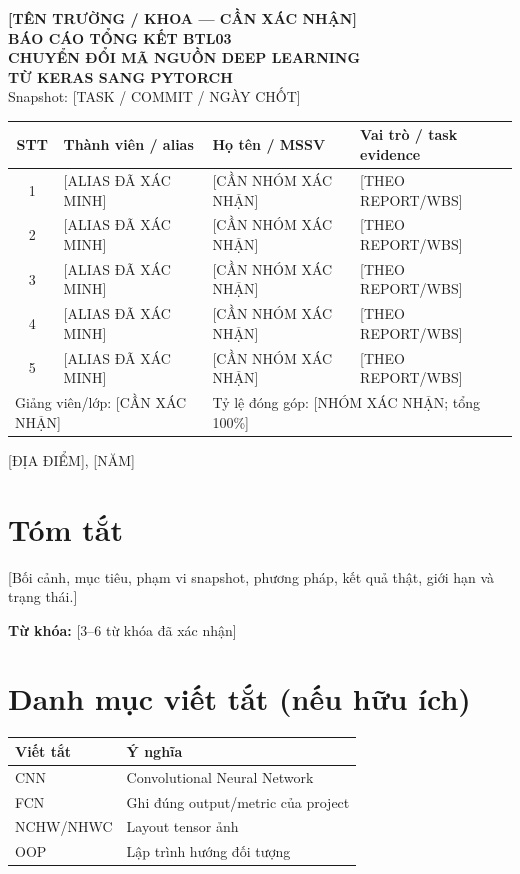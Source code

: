 \begin{titlepage}
\thispagestyle{empty}
\begin{center}
\vspace*{1.4cm}
{\Large\bfseries [TÊN TRƯỜNG / KHOA — CẦN XÁC NHẬN]}\\[1.5cm]
{\Large\bfseries BÁO CÁO TỔNG KẾT BTL03}\\[0.6cm]
{\LARGE\bfseries CHUYỂN ĐỔI MÃ NGUỒN DEEP LEARNING\\ TỪ KERAS SANG PYTORCH}\\[0.8cm]
Snapshot: [TASK / COMMIT / NGÀY CHỐT]

\vfill
\begin{tabularx}{\textwidth}{c p{} p{} X}
\toprule
STT & Thành viên / alias & Họ tên / MSSV & Vai trò / task evidence \\
\midrule
1 & [ALIAS ĐÃ XÁC MINH] & [CẦN NHÓM XÁC NHẬN] & [THEO REPORT/WBS] \\
2 & [ALIAS ĐÃ XÁC MINH] & [CẦN NHÓM XÁC NHẬN] & [THEO REPORT/WBS] \\
3 & [ALIAS ĐÃ XÁC MINH] & [CẦN NHÓM XÁC NHẬN] & [THEO REPORT/WBS] \\
4 & [ALIAS ĐÃ XÁC MINH] & [CẦN NHÓM XÁC NHẬN] & [THEO REPORT/WBS] \\
5 & [ALIAS ĐÃ XÁC MINH] & [CẦN NHÓM XÁC NHẬN] & [THEO REPORT/WBS] \\
\midrule
\multicolumn{2}{l}{Giảng viên/lớp: [CẦN XÁC NHẬN]} & \multicolumn{2}{l}{Tỷ lệ đóng góp: [NHÓM XÁC NHẬN; tổng 100\%]} \\
\bottomrule
\end{tabularx}
\vfill
[ĐỊA ĐIỂM], [NĂM]
\end{center}
\end{titlepage}

\chapter*{Tóm tắt}
[Bối cảnh, mục tiêu, phạm vi snapshot, phương pháp, kết quả thật, giới hạn và trạng thái.]

\noindent\textbf{Từ khóa:} [3--6 từ khóa đã xác nhận]

\chapter*{Danh mục viết tắt (nếu hữu ích)}
\begin{tabularx}{\textwidth}{lY}
\toprule Viết tắt & Ý nghĩa \\
\midrule
CNN & Convolutional Neural Network \\
FCN & Ghi đúng output/metric của project \\
NCHW/NHWC & Layout tensor ảnh \\
OOP & Lập trình hướng đối tượng \\
\bottomrule
\end{tabularx}


